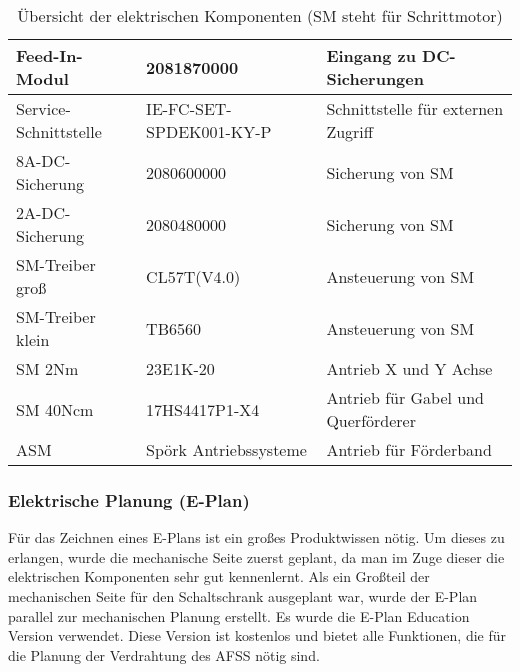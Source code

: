 \begin{table}[h!]
\begin{tabular}{|l|l|l|}
            Feed-In-Modul & 2081870000 & Eingang zu DC-Sicherungen \\ \hline            
            Service-Schnittstelle & IE-FC-SET-SPDEK001-KY-P & Schnittstelle für externen Zugriff \\ \hline
            8A-DC-Sicherung & 2080600000 & Sicherung von SM \\ \hline
            2A-DC-Sicherung & 2080480000 & Sicherung von SM \\ \hline
            SM-Treiber groß & CL57T(V4.0) & Ansteuerung von SM \\ \hline
            SM-Treiber klein & TB6560 & Ansteuerung von SM \\ \hline
            SM 2Nm & 23E1K-20 & Antrieb X und Y Achse \\ \hline
            SM 40Ncm & 17HS4417P1-X4 & Antrieb für Gabel und Querförderer \\ \hline
            ASM & Spörk Antriebssysteme & Antrieb für Förderband \\ \hline
        \end{tabular}
        \caption{Übersicht der elektrischen Komponenten (SM steht für Schrittmotor)}
        \label{tab:elektrische_komponenten}
    \end{table}
\subsubsection{Elektrische Planung (E-Plan)}
\label{sec:Elektrische Planung}
    Für das Zeichnen eines E-Plans ist ein großes Produktwissen nötig. Um dieses zu erlangen, wurde die mechanische Seite zuerst geplant, da man im  Zuge dieser die elektrischen Komponenten sehr gut kennenlernt. Als ein Großteil der mechanischen Seite für den Schaltschrank ausgeplant war, wurde der E-Plan parallel zur mechanischen Planung erstellt. Es wurde die E-Plan Education Version verwendet. Diese Version ist kostenlos und bietet alle Funktionen, die für die Planung der Verdrahtung des AFSS nötig sind.
